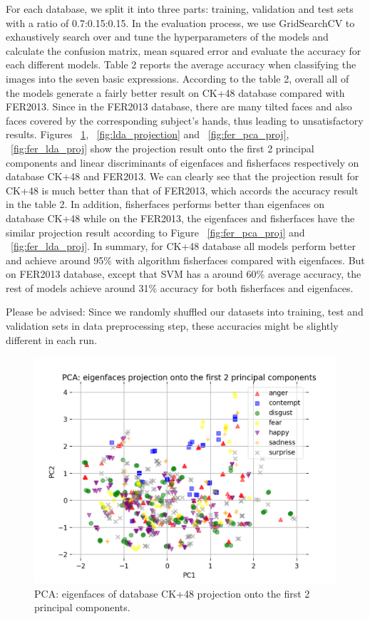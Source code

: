 \documentclass[10pt,twocolumn,letterpaper]{article}
\begin{document}
For each database, we split it into three parts: training, validation and test sets with a ratio of 0.7:0.15:0.15. In the evaluation process, we use GridSearchCV to exhaustively search over and tune the hyperparameters of the models and calculate the confusion matrix, mean squared error and evaluate the accuracy for each different models. Table 2 reports the average accuracy when classifying the images into the seven basic expressions. According to the table 2, overall all of the models generate a fairly better result on CK+48 database compared with FER2013. Since in the FER2013 database, there are many tilted faces and also faces covered by the corresponding subject's hands, thus leading to unsatisfactory results. Figures ~\ref{fig:pca_projection}, ~\ref{fig:lda_projection} and ~\ref{fig:fer_pca_proj}, ~\ref{fig:fer_lda_proj} show the projection result onto the first 2 principal components and linear discriminants of eigenfaces and fisherfaces respectively on database CK+48 and FER2013. We can clearly see that the projection result for CK+48 is much better than that of FER2013, which accords the accuracy result in the table 2. In addition, fisherfaces performs better than eigenfaces on database CK+48 while on the FER2013, the eigenfaces and fisherfaces have the similar projection result according to Figure ~\ref{fig:fer_pca_proj} and ~\ref{fig:fer_lda_proj}. In summary, for CK+48 database all models perform better and achieve around 95\% with algorithm fisherfaces compared with eigenfaces. But on FER2013 database, except that SVM has a around 60\% average accuracy, the rest of models achieve around 31\% accuracy for both fisherfaces and eigenfaces.

Please be advised: Since we randomly shuffled our datasets into training, test and validation sets in data preprocessing step, these accuracies might be slightly different in each run.

\begin{figure}[t]
\begin{center}
  \includegraphics[width=0.8\linewidth]{Feature Extraction Images/pca_projection.png}
  \caption{PCA: eigenfaces of database CK+48 projection onto the first 2 principal components.}
  \label{fig:pca_projection}
\end{center}
\end{figure}
\end{document}

